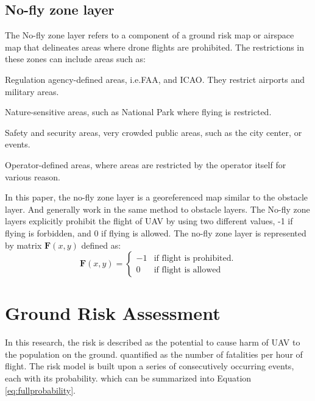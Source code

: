 \documentclass[12pt]{report}
\begin{document}
        \subsection{No-fly zone layer}
            The No-fly zone layer refers to a component of a ground risk map or airspace map that delineates areas where
            drone flights are prohibited. The restrictions in these zones can include areas such as:
            \begin{myitemize}
                \item Regulation agency-defined areas, i.e.\ac{FAA}, and \ac{ICAO}. They restrict airports and military areas.
                \item Nature-sensitive areas, such as National Park where flying is restricted.
                \item Safety and security areas, very crowded public areas, such as the city center, or events.
                \item Operator-defined areas, where areas are restricted by the operator itself for various reason. 
            \end{myitemize}

            In this paper, the no-fly zone layer is a georeferenced map similar to the obstacle layer. And generally
            work in the same method to obstacle layers. The No-fly zone layers explicitly prohibit the flight of UAV by
            using two different values, -1 if flying is forbidden, and 0 if flying is allowed. The no-fly zone layer is
            represented by matrix \(\mathbf{F}(x, y)\) defined as:
            \begin{equation}
                \mathbf{F}(x, y) = 
                \begin{cases}    
                    -1 & \text{if flight is prohibited.} \\
                    0 & \text{if flight is allowed}
                \end{cases}
            \end{equation}


    \pagebreak
    \section{Ground Risk Assessment}
        In this research, the risk is described as the potential to cause harm of UAV to the population on the ground.
        quantified as the number of fatalities per hour of flight. The risk model is built upon a series of
        consecutively occurring events, each with its probability. which can be summarized into Equation
        \ref{eq:fullprobability}.
        
\end{document}
